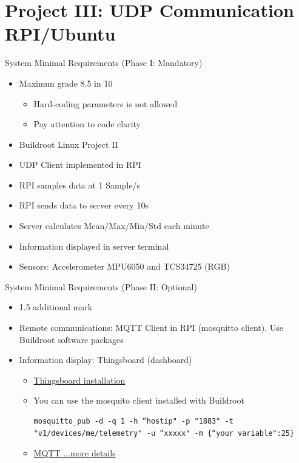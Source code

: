 \section{Project III: UDP Communication RPI/Ubuntu}
\begin{frame}{System Minimal Requirements (Phase I: Mandatory)}
    \begin{itemize}
        \item Maximun grade 8.5 in 10
            \begin{itemize}
                \item Hard-coding parameters is not allowed
                \item Pay attention to code clarity
            \end{itemize}
        \item Buildroot Linux Project II
        \item UDP Client implemented in RPI
        \item RPI samples data at 1 Sample/s
        \item RPI sends data to server every 10s
        \item Server calculates Mean/Max/Min/Std each minute
        \item Information displayed in server terminal
         \item Sensors: Accelerometer MPU6050 and TCS34725 (RGB)
    \end{itemize}
\end{frame}

\begin{frame}[fragile]{System Minimal Requirements (Phase II: Optional)}
    \begin{itemize} 
        \item 1.5 additional mark 
        \item Remote communications: MQTT Client in RPI (mosquitto client). Use Buildroot software packages
        \item Information display: Thingsboard (dashboard)
            \begin{itemize}
                \item \href {https://thingsboard.io/docs/user-guide/install/ubuntu/}{Thingsboard installation }
                \item You can use the mosquito client installed with Buildroot
                \begin{verbatim}
mosquitto_pub -d -q 1 -h “hostip" -p "1883" -t "v1/devices/me/telemetry" -u “xxxxx" -m {“your variable":25}
                \end{verbatim}
                \item \href{https://thingsboard.io/docs/getting-started-guides/helloworld/?connectdevice=mqtt-linux}{MQTT ...more details}

            \end{itemize}
    \end{itemize}
\end{frame}

